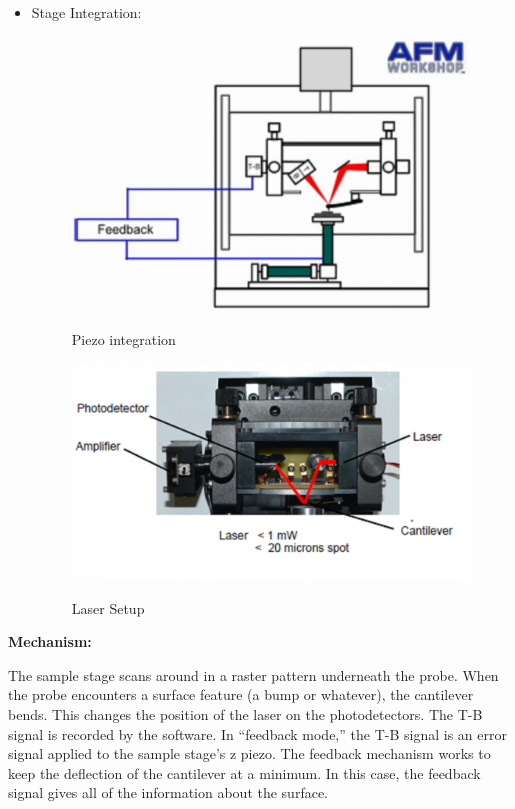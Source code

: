 \documentclass{../lab}
\begin{document}
\begin{itemize}
    \item Stage Integration:
    
    \begin{figure}[H]
    \centering
      \href{http://experimentationlab.berkeley.edu/sites/default/files/AFMImages/AFMdiagram.png}{\includegraphics[height=150\px,keepaspectratio]{images/AFMdiagram.png}}
      \caption{Piezo integration}
      \label{fig:PiezoIntegration}
    \endminipage\hfill
    \centering
      \href{http://experimentationlab.berkeley.edu/sites/default/files/AFMImages/AFMstage2.PNG}{\includegraphics[height=150\px,keepaspectratio]{images/AFMstage2.PNG}}
      \caption{Laser Setup}
        \label{fig:LaserSertup}
    \endminipage
    \end{figure}

\end{itemize}

\textbf{Mechanism:}

The sample stage scans around in a raster pattern underneath the probe. When the probe encounters a surface feature (a bump or whatever), the cantilever bends. This changes the position of the laser on the photodetectors. The T-B signal is recorded by the software. In ``feedback mode,'' the T-B signal is an error signal applied to the sample stage's z piezo. The feedback mechanism works to keep the deflection of the cantilever at a minimum. In this case, the feedback signal gives all of the information about the surface.
\end{document}
